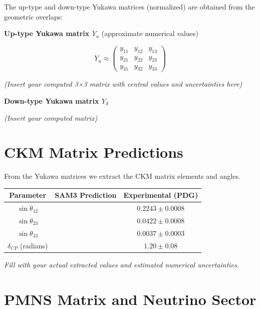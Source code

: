 \documentclass[11pt,a4paper]{article}
\begin{document}
The up-type and down-type Yukawa matrices (normalized) are obtained from the geometric overlaps:

\begin{center}
\textbf{Up-type Yukawa matrix \(Y_u\)} (approximate numerical values)
\end{center}

\begin{equation}
Y_u \approx 
\begin{pmatrix}
y_{11} & y_{12} & y_{13} \\
y_{21} & y_{22} & y_{23} \\
y_{31} & y_{32} & y_{33}
\end{pmatrix}
\end{equation}

\textit{(Insert your computed 3×3 matrix with central values and uncertainties here)}

\begin{center}
\textbf{Down-type Yukawa matrix \(Y_d\)}
\end{center}

\textit{(Insert your computed matrix)}

\section{CKM Matrix Predictions}

From the Yukawa matrices we extract the CKM matrix elements and angles.

\begin{center}
\begin{tabular}{c|c|c}
\hline
\textbf{Parameter} & \textbf{SAM3 Prediction} & \textbf{Experimental (PDG)} \\
\hline
\(\sin\theta_{12}\) & & \(0.2243 \pm 0.0008\) \\
\(\sin\theta_{23}\) & & \(0.0422 \pm 0.0008\) \\
\(\sin\theta_{13}\) & & \(0.0037 \pm 0.0003\) \\
\(\delta_{CP}\) (radians) & & \(1.20 \pm 0.08\) \\
\hline
\end{tabular}
\end{center}

\textit{Fill with your actual extracted values and estimated numerical uncertainties.}

\section{PMNS Matrix and Neutrino Sector}
\end{document}
